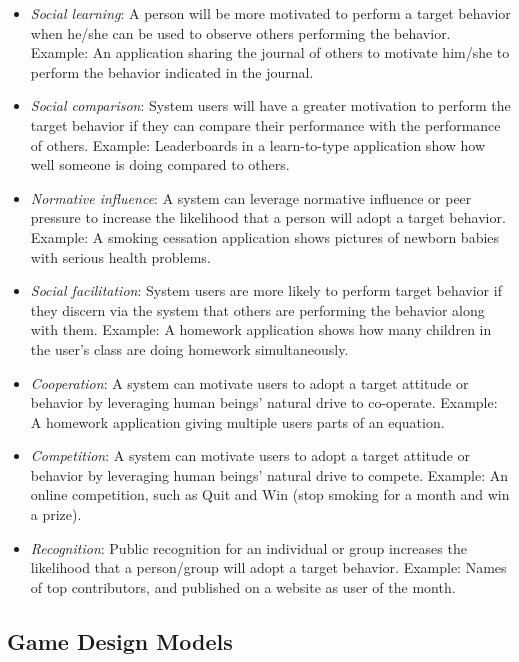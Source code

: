 \begin{itemize}
\item \emph{Social learning}:
A person will be more motivated to perform a target behavior when he/she can be used to observe others performing the behavior.
Example: An application sharing the journal of others to motivate him/she to perform the behavior indicated in the journal.

\item \emph{Social comparison}:
System users will have a greater motivation to perform the target behavior if they can compare their performance with the performance of others.
Example: Leaderboards in a learn-to-type application show how well someone is doing compared to others.

\item \emph{Normative influence}:
A system can leverage normative influence or peer pressure to increase the likelihood that a person will adopt a target behavior.
Example: A smoking cessation application shows pictures of newborn babies with serious health problems.

\item \emph{Social facilitation}:
System users are more likely to perform target behavior if they discern via the system that others are performing the behavior along with them.
Example: A homework application shows how many children in the
user's class are doing homework simultaneously.

\item \emph{Cooperation}:
A system can motivate users to adopt a target attitude or behavior by leveraging human beings' natural drive to co-operate.
Example: A homework application giving multiple users parts of an equation.

\item \emph{Competition}:
A system can motivate users to adopt a target attitude or behavior by leveraging human beings' natural drive to compete.
Example: An online competition, such as Quit and Win (stop smoking for a month and win a prize).

\item \emph{Recognition}:
Public recognition for an individual or group increases the likelihood that a person/group will adopt a target behavior.
Example: Names of top contributors, and published on a website as user of the month.
\end{itemize}


\subsection{Game Design Models}
\label{subsec:game-design-models}

